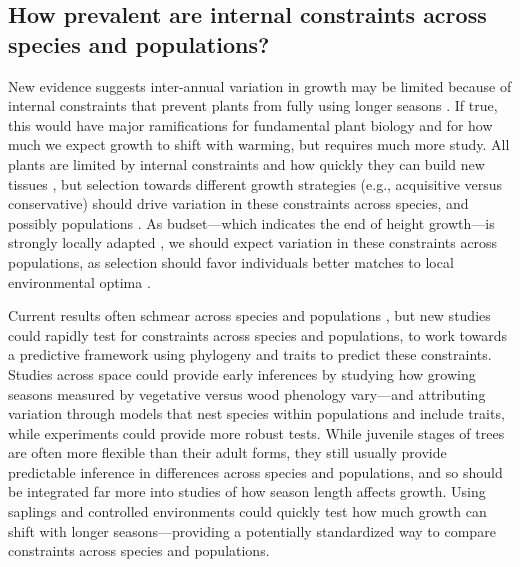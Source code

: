 \documentclass[11pt]{article}
\begin{document}


\subsection*{How prevalent are internal constraints across species and populations?}

New evidence suggests inter-annual variation in growth may be limited because of internal constraints that prevent plants from fully using longer seasons \citep{zohner2023effect}. If true, this would have major ramifications for fundamental plant biology and for how much we expect growth to shift with warming, but requires much more study. All plants are limited by internal constraints and how quickly they can build new tissues \citep{marchand2021timing,luo2024internal}, but selection towards different growth strategies (e.g., acquisitive versus conservative) should drive variation in these constraints across species, and possibly populations \citep{mckown2016impacts,soolanayakanahally2013timing}. As budset---which indicates the end of height growth---is strongly locally adapted \citep{aitken2016,zeng2024weak}, we should expect variation in these constraints across populations, as selection should favor individuals better matches to local environmental optima \citep{Colautti:2010,mckown2014np}. 

Current results often schmear across species and populations \citep[e.g., studies using NDVI,][]{zohner2023effect}, but new studies could rapidly test for constraints across species and populations, to work towards a predictive framework using phylogeny and traits to predict these constraints. %
Studies across space could provide early inferences by studying how growing seasons measured by vegetative versus wood phenology vary---and attributing variation through models that nest species within populations and include traits, while experiments could provide more robust tests. While juvenile stages of trees are often more flexible than their adult forms, they still usually provide predictable inference in differences across species and populations, and so should be integrated far more into studies of how season length affects growth. Using saplings and controlled environments could quickly test how much growth can shift with longer seasons---providing a potentially standardized way to compare constraints across species and populations. %
\end{document}
